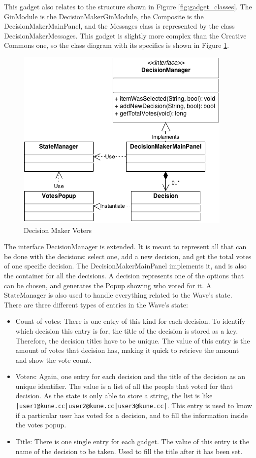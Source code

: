 This gadget also relates to the structure shown in Figure \ref{fig:gadget_classes}. The GinModule is the DecisionMakerGinModule, the Composite is the DecisionMakerMainPanel, and the Messages class is represented by the class DecisionMakerMessages. This gadget is slightly more complex than the Creative Commons one, so the class diagram with its specifics is shown in Figure \ref{fig:decision_maker_diagram}.\\[.2cm]
\begin{figure}[h]
  \center
    \includegraphics[keepaspectratio, scale=0.5]{Media/Diagrams/Gadget/DecisionMaker.png}
  \caption{Decision Maker Voters}
  \label{fig:decision_maker_diagram}
\end{figure}
The interface DecisionManager is extended. It is meant to represent all that can be done with the decisions: select one, add a new decision, and get the total votes of one specific decision. The DecisionMakerMainPanel implements it, and is also the container for all the decisions. A decision represents one of the options that can be chosen, and generates the Popup showing who voted for it. A StateManager is also used to handle everything related to the Wave's state.\\[.2cm]
There are three different types of entries in the Wave's state:
\begin{itemize}
  \item Count of votes: There is one entry of this kind for each decision. To identify which decision this entry is for, the title of the decision is stored as a key. Therefore, the decision titles have to be unique. The value of this entry is the amount of votes that decision has, making it quick to retrieve the amount and show the vote count.
  \item Voters: Again, one entry for each decision and the title of the decision as an unique identifier. The value is a list of all the people that voted for that decision. As the state is only able to store a string, the list is like \verb+|user1@kune.cc|user2@kune.cc|user3@kune.cc|+. This entry is used to know if a particular user has voted for a decision, and to fill the information inside the votes popup.
  \item Title: There is one single entry for each gadget. The value of this entry is the name of the decision to be taken. Used to fill the title after it has been set.
\end{itemize}
